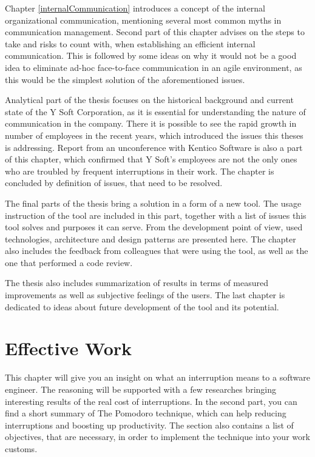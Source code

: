 \documentclass[11pt,singleside]{myfithesis2}
\begin{document}
Chapter \ref{internalCommunication} introduces a concept of the internal organizational communication, mentioning several most common myths in communication management. Second part of this chapter advises on the steps to take and risks to count with, when establishing an efficient internal communication. This is followed by some ideas on why it would not be a good idea to eliminate ad-hoc face-to-face communication in an agile environment, as this would be the simplest solution of the aforementioned issues.

Analytical part of the thesis focuses on the historical background and current state of the Y Soft Corporation, as it is essential for understanding the nature of communication in the company. There it is possible to see the rapid growth in number of employees in the recent years, which introduced the issues this theses is addressing. Report from an unconference with Kentico Software is also a part of this chapter, which confirmed that Y Soft's employees are not the only ones who are troubled by frequent interruptions in their work. The chapter is concluded by definition of issues, that need to be resolved.

The final parts of the thesis bring a solution in a form of a new tool. The usage instruction of the tool are included in this part, together with a list of issues this tool solves and purposes it can serve. From the development point of view, used technologies, architecture and design patterns are presented here. The chapter also includes the feedback from colleagues that were using the tool, as well as the one that performed a code review.

The thesis also includes summarization of results in terms of measured improvements as well as subjective feelings of the users. The last chapter is dedicated to ideas about future development of the tool and its potential.


\chapter{Effective Work}

This chapter will give you an insight on what an interruption means to a software engineer. The reasoning will be supported with a few researches bringing interesting results of the real cost of interruptions. In the second part, you can find a short summary of The Pomodoro technique, which can help reducing interruptions and boosting up productivity. The section also contains a list of objectives, that are necessary, in order to implement the technique into your work customs.
\end{document}
